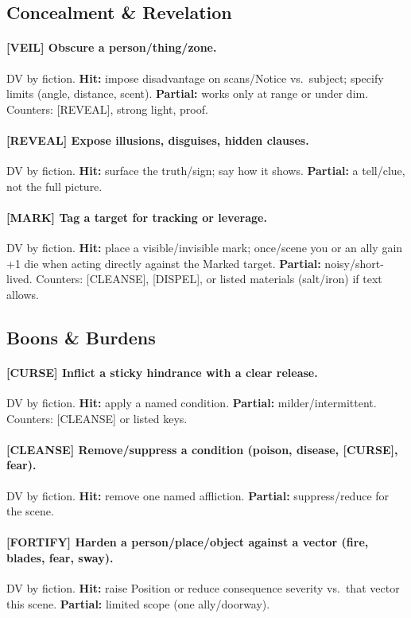 \subsection{Concealment \& Revelation}
\paragraph{[VEIL] Obscure a person/thing/zone.}
DV by fiction. \textbf{Hit:} impose disadvantage on scans/Notice vs.\ subject; specify limits (angle, distance, scent). \textbf{Partial:} works only at range or under dim. 
Counters: [REVEAL], strong light, proof.

\paragraph{[REVEAL] Expose illusions, disguises, hidden clauses.}
DV by fiction. \textbf{Hit:} surface the truth/sign; say how it shows. \textbf{Partial:} a tell/clue, not the full picture.

\paragraph{[MARK] Tag a target for tracking or leverage.}
DV by fiction. \textbf{Hit:} place a visible/invisible mark; once/scene you or an ally gain +1 die when acting directly against the Marked target. \textbf{Partial:} noisy/short-lived. 
Counters: [CLEANSE], [DISPEL], or listed materials (salt/iron) if text allows.

\subsection{Boons \& Burdens}
\paragraph{[CURSE] Inflict a sticky hindrance with a clear release.}
DV by fiction. \textbf{Hit:} apply a named condition. \textbf{Partial:} milder/intermittent. Counters: [CLEANSE] or listed keys.

\paragraph{[CLEANSE] Remove/suppress a condition (poison, disease, [CURSE], fear).}
DV by fiction. \textbf{Hit:} remove one named affliction. \textbf{Partial:} suppress/reduce for the scene.

\paragraph{[FORTIFY] Harden a person/place/object against a vector (fire, blades, fear, sway).}
DV by fiction. \textbf{Hit:} raise Position or reduce consequence severity vs.\ that vector this scene. \textbf{Partial:} limited scope (one ally/doorway).


